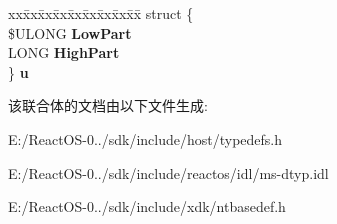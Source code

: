 \begin{DoxyCompactItemize}
\begin{tabbing}
\end{tabbing}\item 
\mbox{\label{union___l_a_r_g_e___i_n_t_e_g_e_r_a4115cafec22f0d96105184600a1023a6}} 
\begin{tabbing}
xx\=xx\=xx\=xx\=xx\=xx\=xx\=xx\=xx\=\kill
struct \{\\
\>\$ULONG {\bfseries LowPart}\\
\>LONG {\bfseries HighPart}\\
\} {\bfseries u}\\

\end{tabbing}\end{DoxyCompactItemize}


该联合体的文档由以下文件生成\+:\begin{DoxyCompactItemize}
\item 
E\+:/\+React\+O\+S-\/0../sdk/include/host/typedefs.\+h\item 
E\+:/\+React\+O\+S-\/0../sdk/include/reactos/idl/ms-\/dtyp.\+idl\item 
E\+:/\+React\+O\+S-\/0../sdk/include/xdk/ntbasedef.\+h\end{DoxyCompactItemize}
